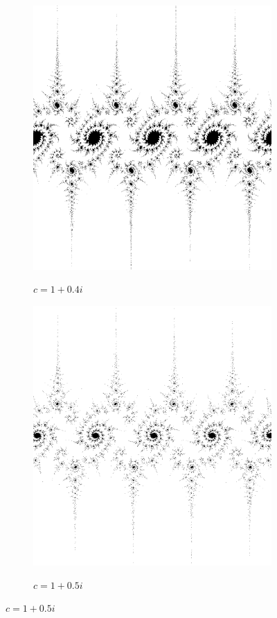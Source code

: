 \begin{figure}[!htb]
\begin{subfigure}{1.0\textwidth}
        \includegraphics[width=\linewidth]{./images/opencal/julia5.png}
        \label{fig:julia5}
        \caption{$c=1+0.4i$}
    \end{subfigure}
    \endminipage\hfill
        \begin{subfigure}{1.0\textwidth}
        \includegraphics[width=\linewidth]{./images/opencal/julia6.png}
        \label{fig:julia6}
        \caption{$c=1+0.5i$}
    \end{subfigure}
    \endminipage
    

\end{figure}
